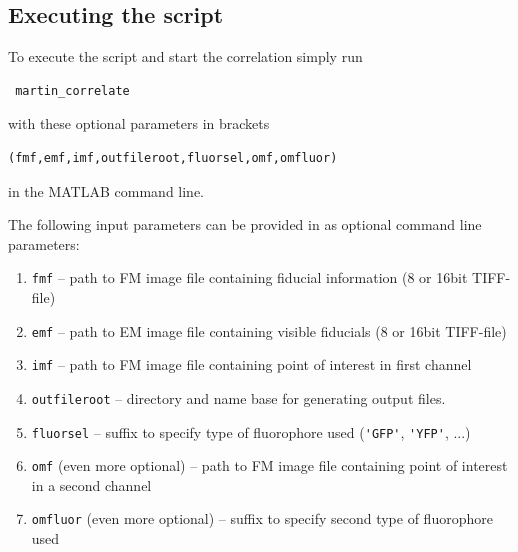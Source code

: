 \documentclass[10pt,a4paper,onepage,DIV12]{scrartcl}
\begin{document}
\subsection{Executing the script}
To execute the script and start the correlation simply run \begin{verbatim}
 martin_correlate\end{verbatim} with these optional parameters in brackets \begin{verbatim}(fmf,emf,imf,outfileroot,fluorsel,omf,omfluor)
\end{verbatim}
 in the MATLAB command line.
 
The following input parameters can be provided in as optional command line parameters:
\begin{enumerate}
 \item\texttt{fmf} -- path to FM image file containing fiducial information (8 or 16bit TIFF-file)
 \item\texttt{emf} -- path to EM image file containing visible fiducials (8 or 16bit TIFF-file)
 \item\texttt{imf} -- path to FM image file containing point of interest in first channel
 \item\texttt{outfileroot} -- directory and name base for generating output files.
 \item\texttt{fluorsel} -- suffix to specify type of fluorophore used (\verb|'GFP'|, \verb|'YFP'|, ...)
 \item\texttt{omf} (even more optional) -- path to FM image file containing point of interest in a second channel
 \item\texttt{omfluor} (even more optional) -- suffix to specify second type of fluorophore used
\end{enumerate}
\newpage
\end{document}
